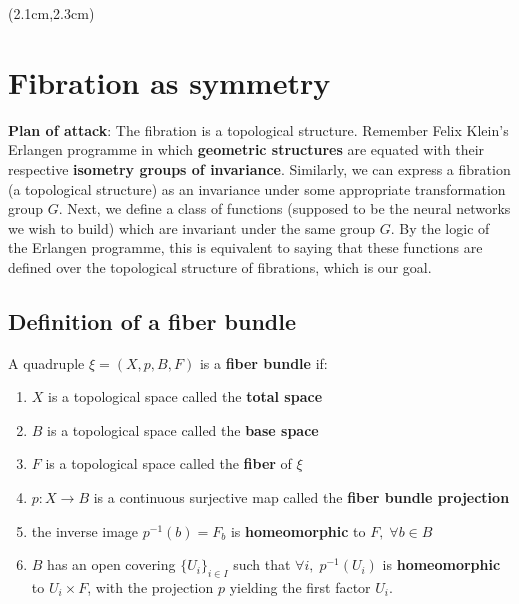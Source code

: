\begin{preview}
\begin{textblock*}{5cm}(2.1cm,2.3cm) %
	{\color{red}{\large \textcircled{\small \themypage}}}
	\addtocounter{mypage}{1}
\end{textblock*}

\begin{minipage}{\textwidth}
	\setlength{\parskip}{0.4\baselineskip}

\section{Fibration as symmetry}

\textbf{Plan of attack}:  The fibration is a topological structure.  Remember Felix Klein's Erlangen programme in which \textbf{geometric structures} are equated with their respective \textbf{isometry groups of invariance}.  Similarly, we can express a fibration (a topological structure) as an invariance under some appropriate transformation group $G$.  Next, we define a class of functions (supposed to be the neural networks we wish to build) which are invariant under the same group $G$.  By the logic of the Erlangen programme, this is equivalent to saying that these functions are defined over the topological structure of fibrations, which is our goal.

\subsection{Definition of a fiber bundle}

A quadruple $\xi = (X, p, B, F)$ is a \textbf{fiber bundle} if:
\begin{enumerate}[label=(\roman*)]
	\item $X$ is a topological space called the \textbf{total space}
	\item $B$ is a topological space called the \textbf{base space}
	\item $F$ is a topological space called the \textbf{fiber} of $\xi$
	\item $p: X \rightarrow B$ is a continuous surjective map called the \textbf{fiber bundle projection}
	\item the inverse image $p^{-1}(b) = F_b$ is \textbf{homeomorphic} to $ F ,\; \forall b \in B $
	\item $B$ has an open covering $\{ U_i \}_{i \in I}$ such that $\forall i, \; p^{-1}(U_i) $ is \textbf{homeomorphic} to $U_i \times F$, with the projection $p$ yielding the first factor $U_i$.  
\end{enumerate}


\end{minipage}
\end{preview}
